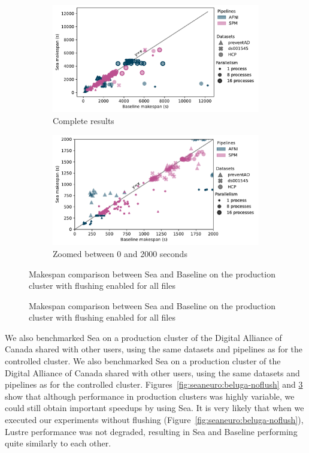 \documentclass[fleqn,10pt]{wlscirep}
\begin{document}
\begin{figure}
\begin{subfigure}{0.5\textwidth}
    \centering
    \captionsetup{width=.85\linewidth}
    \includegraphics[width=\columnwidth]{figures/beluga_withflush_nozoom.pdf}%
    \caption{Complete results}\label{fig:seaneuro:belugafullwf}
\end{subfigure}
\begin{subfigure}{0.5\textwidth}
    \centering
    \captionsetup{width=.85\linewidth}
    \includegraphics[width=\linewidth]{figures/beluga_withflush_zoom.pdf}
    \caption{Zoomed between 0 and 2000 seconds}\label{fig:seaneuro:belugazoomwf}
\end{subfigure}
\caption{Makespan comparison between Sea and Baseline on the production cluster with flushing enabled for all files}
\caption{Makespan comparison between Sea and Baseline on the production cluster with flushing enabled for all files}
\label{fig:seaneuro:beluga-wflush}
\end{figure}

  We also benchmarked Sea on a production cluster of the Digital Alliance of Canada
  shared with other users,
  using the same datasets and pipelines as for the controlled cluster. 
  We also benchmarked Sea on a production cluster of the Digital Alliance of Canada
  shared with other users,
  using the same datasets and pipelines as for the controlled cluster. 
  Figures~\ref{fig:seaneuro:beluga-noflush} and \ref{fig:seaneuro:beluga-wflush}
  show that although performance in production clusters was highly variable,
  we could still obtain important speedups by using Sea. It is very likely that when we
  executed our experiments without flushing
  (Figure~\ref{fig:seaneuro:beluga-noflush}), Lustre performance was not degraded, 
  resulting in Sea and Baseline performing
  quite similarly to each other.
  
\end{document}
